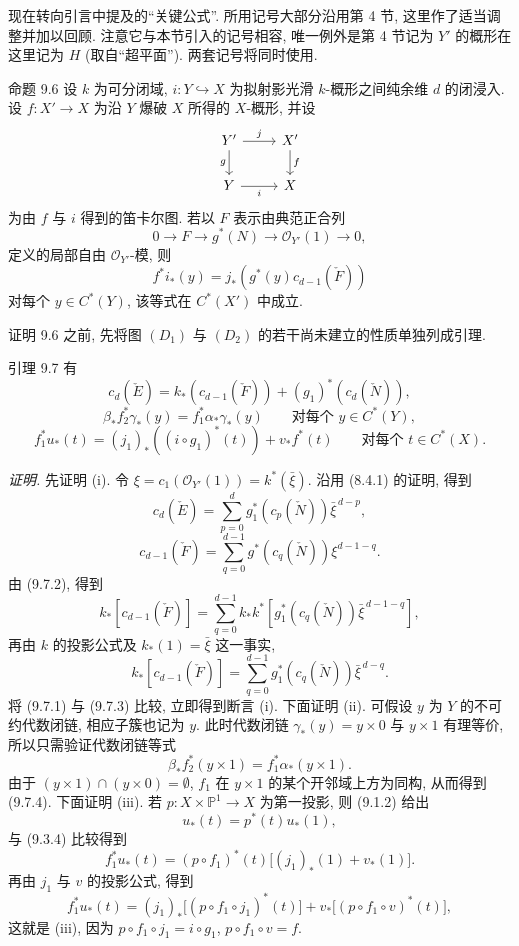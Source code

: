 现在转向引言中提及的“关键公式”. 所用记号大部分沿用第 4 节, 这里作了适当调整并加以回顾. 注意它与本节引入的记号相容, 唯一例外是第 4 节记为 $Y'$ 的概形在这里记为 $H$ (取自“超平面”). 两套记号将同时使用.

\begin{statement}{命题 9.6}
设 $k$ 为可分闭域, $i:Y\hookrightarrow X$ 为拟射影光滑 $k$-概形之间纯余维 $d$ 的闭浸入. 设 $f:X'\to X$ 为沿 $Y$ 爆破 $X$ 所得的 $X$-概形, 并设
\[
\begin{tikzcd}
Y'\arrow[r,"j"]\arrow[d,"g"']&X'\arrow[d,"f"]\\
Y\arrow[r,"i"']&X
\end{tikzcd}
\]
为由 $f$ 与 $i$ 得到的笛卡尔图. 若以 $F$ 表示由典范正合列
\[
0\to F\to g^*(N)\to\mathcal O_{Y'}(1)\to0,
\tag{9.6.1}
\]
定义的局部自由 $\mathcal O_{Y'}$-模, 则
\[
f^*i_*(y)=j_*(g^*(y)c_{d-1}(\check F))
\tag{9.6.2}
\]
对每个 $y\in C^*(Y)$, 该等式在 $C^*(X')$ 中成立.
\end{statement}

证明 9.6 之前, 先将图 $(D_1)$ 与 $(D_2)$ 的若干尚未建立的性质单独列成引理.

\begin{statement}{引理 9.7}
有
\[
c_d(\check E)=k_*(c_{d-1}(\check F))+(g_1)^*(c_d(\check N)),
\tag{9.7 i}
\]
\[
\beta_*f_2^*\gamma_*(y)=f_1^*\alpha_*\gamma_*(y)\qquad\text{对每个 }y\in C^*(Y),
\tag{9.7 ii}
\]
\[
f_1^*u_*(t)=(j_1)_*((i\circ g_1)^*(t))+v_*f^*(t)\qquad\text{对每个 }t\in C^*(X).
\tag{9.7 iii}
\]
\end{statement}

\emph{证明.} 先证明 (i). 令 $\xi=c_1(\mathcal O_{Y'}(1))=k^*(\bar\xi)$. 沿用 (8.4.1) 的证明, 得到
\[
c_d(\check E)=\sum_{p=0}^d g_1^*(c_p(\check N))\bar\xi^{\,d-p},
\tag{9.7.1}
\]
\[
c_{d-1}(\check F)=\sum_{q=0}^{d-1}g^*(c_q(\check N))\xi^{d-1-q}.
\tag{9.7.2}
\]
由 (9.7.2), 得到
\[
k_*[c_{d-1}(\check F)]
=\sum_{q=0}^{d-1}k_*k^*[g_1^*(c_q(\check N))\bar\xi^{\,d-1-q}],
\]
再由 $k$ 的投影公式及 $k_*(1)=\bar\xi$ 这一事实,
\[
k_*[c_{d-1}(\check F)]=\sum_{q=0}^{d-1}g_1^*(c_q(\check N))\bar\xi^{\,d-q}.
\tag{9.7.3}
\]
将 (9.7.1) 与 (9.7.3) 比较, 立即得到断言 (i). 下面证明 (ii). 可假设 $y$ 为 $Y$ 的不可约代数闭链, 相应子簇也记为 $y$. 此时代数闭链 $\gamma_*(y)=y\times0$ 与 $y\times1$ 有理等价, 所以只需验证代数闭链等式
\[
\beta_*f_2^*(y\times1)=f_1^*\alpha_*(y\times1).
\tag{9.7.4}
\]
由于 $(y\times1)\cap(y\times0)=\emptyset$, $f_1$ 在 $y\times1$ 的某个开邻域上方为同构, 从而得到 (9.7.4). 下面证明 (iii). 若 $p:X\times\mathbb P^1\to X$ 为第一投影, 则 (9.1.2) 给出
\[
u_*(t)=p^*(t)u_*(1),
\tag{9.7.5}
\]
与 (9.3.4) 比较得到
\[
f_1^*u_*(t)=(p\circ f_1)^*(t)\bigl[(j_1)_*(1)+v_*(1)\bigr].
\tag{9.7.6}
\]
再由 $j_1$ 与 $v$ 的投影公式, 得到
\[
f_1^*u_*(t)=(j_1)_*\bigl[(p\circ f_1\circ j_1)^*(t)\bigr]+v_*\bigl[(p\circ f_1\circ v)^*(t)\bigr],
\tag{9.7.7}
\]
这就是 (iii), 因为 $p\circ f_1\circ j_1=i\circ g_1$, $p\circ f_1\circ v=f$.

